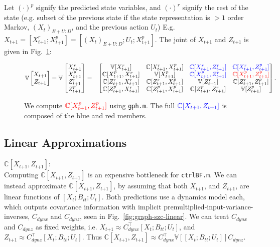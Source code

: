 \documentclass[9pt]{article}
\newcommand{\V}{{\mathbb V}}
\newcommand{\Cov}{{\mathbb C}}
\newcommand{\now}[1]{#1_t}                  %
\newcommand{\new}[1]{#1_{t\mathord{+}1}}    %
\newcommand{\uno}[1]{#1_{tt}}              %
\newcommand{\pne}[1]{#1_{t\mathord{+}1}}   %
\newcommand{\nn}{\nonumber}
\newcommand{\red}[1]{\textcolor{red}{#1}}
\newcommand{\blue}[1]{\textcolor{blue}{#1}}
\begin{document}
Let $(\cdot)^p$ signify the predicted state variables, and $(\cdot)^r$ signify the rest of the state (e.g. subset of the previous state if the state representation is $>1$ order Markov, $(\now{X})_{E+U:D}$, and the previous action $\now{U}$)
E.g. $\new{X} = [\new{X}^r ; \new{X}^p] = [(\now{X})_{E+U:D} ; \now{U}; \new{X}^p]$. The joint of $\new{X}$ and $\pne{Z}$ is given in Fig.~\ref{fig:zc}:
%
\begin{figure}[!h]
\centering
\begin{eqnarray}
 \V \begin{bmatrix} \new{X} \\ \pne{Z} \end{bmatrix} =
 \V \begin{bmatrix} \new{X}^r \\ \new{X}^p \\ \new{Z}^r \\ \new{Z}^p \\\end{bmatrix} &=&
 \begin{bmatrix}
  \V[\new{X}^r              ] & \Cov[\new{X}^r,\new{X}^p] & \blue{\Cov[\new{X}^r  , \new{Z}^r]} & \blue{\Cov[\new{X}^r, \new{Z}^p]} \\
  \Cov[\new{X}^p  ,\new{X}^r] &   \V[\new{X}^p          ] & \blue{\Cov[\new{X}^p  , \new{Z}^r]} &  \red{\Cov[\new{X}^p, \new{Z}^p]} \\
  \Cov[\new{Z}^r  ,\new{X}^r] & \Cov[\new{Z}^r,\new{X}^p] &         \V[\new{Z}^r             ]  &       \Cov[\new{Z}^r, \new{Z}^p]  \\
  \Cov[\new{Z}^p  ,\new{X}^r] & \Cov[\new{Z}^p,\new{X}^p] &       \Cov[\new{Z}^p  , \new{Z}^r]  &         \V[\new{Z}^p           ]  \\
 \end{bmatrix}. \nn
\end{eqnarray}
\caption{We compute $\red{\Cov[\new{X}^p,\pne{Z}^p]}$ using \texttt{gph.m}. The full $\blue{\Cov[\new{X},\pne{Z}]}$ is composed of the blue and red members.}
\label{fig:zc}
\end{figure}

\subsection*{Linear Approximations}

\underline{$\Cov[\new{X},\pne{Z}]$}: \\
Computing $\Cov[\new{X},\pne{Z}]$ is an expensive bottleneck for {\tt ctrlBF.m}.
We can instead approximate $\Cov[\new{X},\pne{Z}]$, by assuming that both $\new{X}$, and $\pne{Z}$,
are linear functions of $[\now{X};\uno{B};\now{U}]$.
Both predictions use a dynamics model each,
which outputs covariance information with implicit premultiplied-input-variance-inverses,
$C_{dynx}$ and $C_{dynz}$, seen in Fig.~\ref{fig:graph-szc-linear}.
We can treat $C_{dynx}$ and $C_{dynz}$ as fixed weights, i.e.
$\new{X} \approx C^{\top}_{dynx}[\now{X};\uno{B};\now{U}]$, and
$\pne{Z} \approx C^{\top}_{dynz}[\now{X};\uno{B};\now{U}]$.
Thus $\Cov[\new{X},\pne{Z}] \approx C^{\top}_{dynx} \V[[\now{X};\uno{B};\now{U}]] C_{dynz}$.
\end{document}
